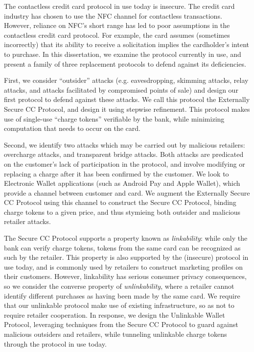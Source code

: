 The contactless credit card protocol in use today is insecure.
The credit card industry has chosen to use the NFC channel for contactless transactions.
However, reliance on NFC's short range has led to poor assumptions in the contactless credit card protocol.
For example, the card assumes (sometimes incorrectly) that its ability to receive a solicitation implies the cardholder's intent to purchase.
In this dissertation, we examine the protocol currently in use,
    and present a family of three replacement protocols to defend against its deficiencies.

First, we consider ``outsider'' attacks (e.g. eavesdropping, skimming attacks, relay attacks, and attacks facilitated by compromised points of sale)
    and design our first protocol to defend against these attacks.
We call this protocol the Externally Secure CC Protocol, and design it using stepwise refinement.
This protocol makes use of single-use ``charge tokens'' verifiable by the bank, while minimizing computation that needs to occur on the card.

Second, we identify two attacks which may be carried out by malicious retailers:
    overcharge attacks, and transparent bridge attacks.
Both attacks are predicated on the customer's lack of participation in the protocol,
    and involve modifying or replacing a charge after it has been confirmed by the customer.
We look to Electronic Wallet applications (such as Android Pay and Apple Wallet), which provide a channel between customer and card.
We augment the Externally Secure CC Protocol using this channel to construct the Secure CC Protocol,
    binding charge tokens to a given price, and thus stymieing both outsider and malicious retailer attacks.

The Secure CC Protocol supports a property known as \emph{linkability}:
    while only the bank can verify charge tokens, tokens from the same card can be recognized as such by the retailer.
This property is also supported by the (insecure) protocol in use today,
    and is commonly used by retailers to construct marketing profiles on their customers.
However, linkability has serious consumer privacy consequences, so we consider the converse property of
    \emph{unlinkability}, where a retailer cannot identify different purchases as having been made by the same card.
We require that our unlinkable protocol make use of existing infrastructure, so as not to require retailer cooperation.
In response, we design the Unlinkable Wallet Protocol,
    leveraging techniques from the Secure CC Protocol to guard against malicious outsiders and retailers,
    while tunneling unlinkable charge tokens through the protocol in use today.
